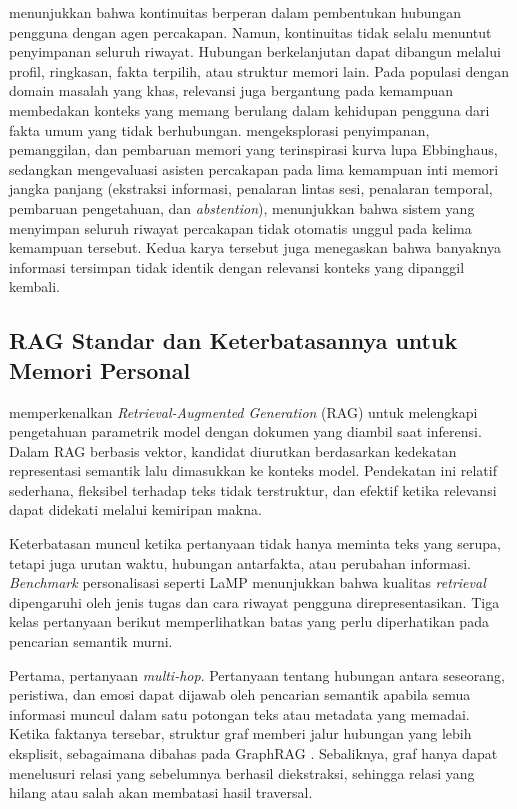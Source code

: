 \textcite{bickmorePicard2005} menunjukkan bahwa kontinuitas berperan dalam pembentukan hubungan pengguna dengan agen percakapan. Namun, kontinuitas tidak selalu menuntut penyimpanan seluruh riwayat. Hubungan berkelanjutan dapat dibangun melalui profil, ringkasan, fakta terpilih, atau struktur memori lain. Pada populasi dengan domain masalah yang khas, relevansi juga bergantung pada kemampuan membedakan konteks yang memang berulang dalam kehidupan pengguna dari fakta umum yang tidak berhubungan. \textcite{zhong2024memorybank} mengeksplorasi penyimpanan, pemanggilan, dan pembaruan memori yang terinspirasi kurva lupa Ebbinghaus, sedangkan \textcite{wu2024longmemeval} mengevaluasi asisten percakapan pada lima kemampuan inti memori jangka panjang (ekstraksi informasi, penalaran lintas sesi, penalaran temporal, pembaruan pengetahuan, dan \textit{abstention}), menunjukkan bahwa sistem yang menyimpan seluruh riwayat percakapan tidak otomatis unggul pada kelima kemampuan tersebut. Kedua karya tersebut juga menegaskan bahwa banyaknya informasi tersimpan tidak identik dengan relevansi konteks yang dipanggil kembali.

\subsection{RAG Standar dan Keterbatasannya untuk Memori Personal}
\label{subsec:rag-keterbatasan}

\textcite{lewis2020rag} memperkenalkan \textit{Retrieval-Augmented Generation} (RAG) untuk melengkapi pengetahuan parametrik model dengan dokumen yang diambil saat inferensi. Dalam RAG berbasis vektor, kandidat diurutkan berdasarkan kedekatan representasi semantik lalu dimasukkan ke konteks model. Pendekatan ini relatif sederhana, fleksibel terhadap teks tidak terstruktur, dan efektif ketika relevansi dapat didekati melalui kemiripan makna.

Keterbatasan muncul ketika pertanyaan tidak hanya meminta teks yang serupa, tetapi juga urutan waktu, hubungan antarfakta, atau perubahan informasi. \textit{Benchmark} personalisasi seperti LaMP \parencite{salemi2024lamp} menunjukkan bahwa kualitas \textit{retrieval} dipengaruhi oleh jenis tugas dan cara riwayat pengguna direpresentasikan. Tiga kelas pertanyaan berikut memperlihatkan batas yang perlu diperhatikan pada pencarian semantik murni.

Pertama, pertanyaan \textit{multi-hop}. Pertanyaan tentang hubungan antara seseorang, peristiwa, dan emosi dapat dijawab oleh pencarian semantik apabila semua informasi muncul dalam satu potongan teks atau metadata yang memadai. Ketika faktanya tersebar, struktur graf memberi jalur hubungan yang lebih eksplisit, sebagaimana dibahas pada GraphRAG \parencite{edge2024graphrag}. Sebaliknya, graf hanya dapat menelusuri relasi yang sebelumnya berhasil diekstraksi, sehingga relasi yang hilang atau salah akan membatasi hasil traversal.

